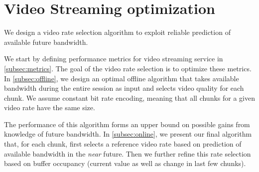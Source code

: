 \section{Video Streaming optimization}\label{sec:optimization}

We design a video rate selection algorithm to exploit reliable
prediction of available future bandwidth.


We start by defining performance metrics for video streaming service in
\autoref{subsec:metrics}. The goal of the video rate selection is to 
optimize these metrics.
In \autoref{subsec:offline}, we design an optimal offline algorithm
that takes available bandwidth during the entire session as input and
selects video quality for each chunk. We assume constant bit
rate encoding, meaning that all chunks for a given video rate have the
same size.

  
The performance of this algorithm forms an upper bound on possible
gains from knowledge of future bandwidth.
In \autoref{subsec:online}, we present our final algorithm that, for
each chunk, first selects a reference video rate  based on prediction of 
available bandwidth in the \emph{near} future. 
Then we further refine this rate selection based on buffer occupancy
(current value as well as change in last few chunks).
%


